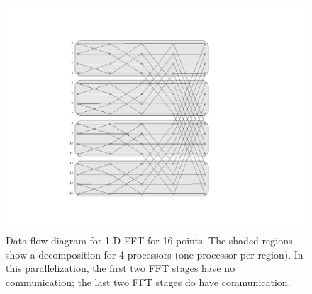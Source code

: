 \begin{figure}[htbp]
\begin{center}
\includegraphics[clip=true,viewport=144 85 576 540,scale=.5]{mdchapter/fig-fft-firstpdf}
\caption{Data flow diagram for 1-D FFT for 16 points.  The shaded
regions show a decomposition for 4 processors (one processor per region).
In this parallelization, 
the first two FFT stages have no communication; the last two FFT stages
do have communication.}
\label{fig:fft1}
\end{center}
\end{figure}

